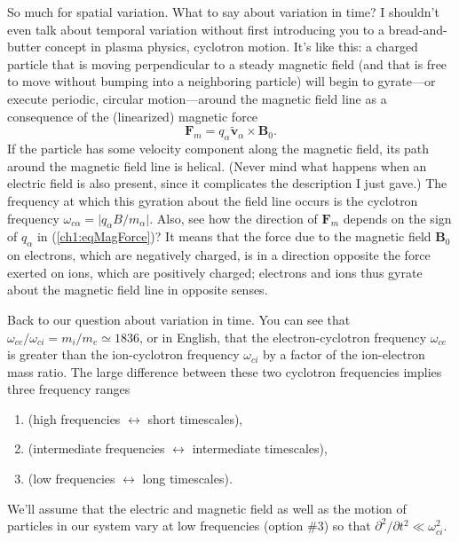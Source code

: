 So much for spatial variation. What to say about variation in time? I shouldn't
even talk about temporal variation without first introducing you to a
bread-and-butter concept in plasma physics, cyclotron motion. It's like this: a
charged particle that is moving perpendicular to a steady magnetic field (and
that is free to move without bumping into a neighboring particle) will begin to
gyrate---or execute periodic, circular motion---around the magnetic field line
as a consequence of the (linearized) magnetic force
\begin{equation} \label{ch1:eqMagForce} 
\mathbf{F}_m = q_\alpha \mathbf{\tilde v}_\alpha \times \mathbf{B}_0.
\end{equation} 
If the particle has some velocity component along the magnetic field, its path
around the magnetic field line is helical. (Never mind what happens when an
electric field is also present, since it complicates the description I just
gave.) The frequency at which this gyration about the field line occurs is the
cyclotron frequency $\omega_{c \alpha} = \vert q_\alpha B /m_\alpha \vert$.
Also, see how the direction of $\mathbf{F}_m$ depends on the sign of $q_\alpha$
in (\ref{ch1:eqMagForce})? It means that the force due to the magnetic field
$\mathbf{B}_0$ on electrons, which are negatively charged, is in a direction
opposite the force exerted on ions, which are positively charged; electrons and
ions thus gyrate about the magnetic field line in opposite senses.

Back to our question about variation in time. You can see that
$\omega_{ce} / \omega_{ci} = m_i/m_e \simeq 1836$, or in English, that the
electron-cyclotron frequency $\omega_{ce}$ is greater than the ion-cyclotron
frequency $\omega_{ci}$ by a factor of the ion-electron mass ratio. The large
difference between these two cyclotron frequencies implies three frequency
ranges \par
\begin{enumerate}
\item {} (high frequencies $\leftrightarrow$ short timescales),
\item {} (intermediate frequencies $\leftrightarrow$ intermediate timescales),
\item {} (low frequencies $\leftrightarrow$ long timescales).
\end{enumerate}
We'll assume that the electric and magnetic field as well as the motion of
particles in our system vary at low frequencies (option \#3) so that
$\partial^2 / \partial t^2 \ll \omega_{ci}^2$. 

